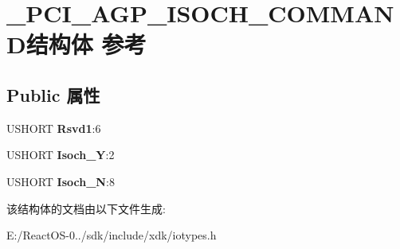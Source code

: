 \hypertarget{struct___p_c_i___a_g_p___i_s_o_c_h___c_o_m_m_a_n_d}{}\section{\+\_\+\+P\+C\+I\+\_\+\+A\+G\+P\+\_\+\+I\+S\+O\+C\+H\+\_\+\+C\+O\+M\+M\+A\+N\+D结构体 参考}
\label{struct___p_c_i___a_g_p___i_s_o_c_h___c_o_m_m_a_n_d}
\subsection*{Public 属性}
\begin{DoxyCompactItemize}
\item 
\mbox{\label{struct___p_c_i___a_g_p___i_s_o_c_h___c_o_m_m_a_n_d_ad61425b7439a029a0291034a55436428}} 
U\+S\+H\+O\+RT {\bfseries Rsvd1}\+:6
\item 
\mbox{\label{struct___p_c_i___a_g_p___i_s_o_c_h___c_o_m_m_a_n_d_a998d56664489aa3abbc44e97ece47f1a}} 
U\+S\+H\+O\+RT {\bfseries Isoch\+\_\+Y}\+:2
\item 
\mbox{\label{struct___p_c_i___a_g_p___i_s_o_c_h___c_o_m_m_a_n_d_a868fcc1b7f7dc50eba82a3c22237b0b8}} 
U\+S\+H\+O\+RT {\bfseries Isoch\+\_\+N}\+:8
\end{DoxyCompactItemize}


该结构体的文档由以下文件生成\+:\begin{DoxyCompactItemize}
\item 
E\+:/\+React\+O\+S-\/0../sdk/include/xdk/iotypes.\+h\end{DoxyCompactItemize}
